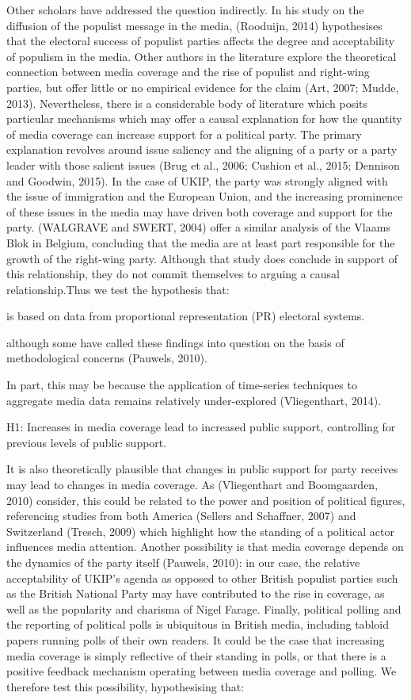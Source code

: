 \documentclass[12pt,article]{article}
\begin{document}
Other scholars have addressed the question indirectly. In his study on
the diffusion of the populist message in the media, (Rooduijn, 2014)
hypothesises that the electoral success of populist parties affects the
degree and acceptability of populism in the media. Other authors in the
literature explore the theoretical connection between media coverage and
the rise of populist and right-wing parties, but offer little or no
empirical evidence for the claim (Art, 2007; Mudde, 2013). Nevertheless,
there is a considerable body of literature which posits particular
mechanisms which may offer a causal explanation for how the quantity of
media coverage can increase support for a political party. The primary
explanation revolves around issue saliency and the aligning of a party
or a party leader with those salient issues (Brug et al., 2006; Cushion
et al., 2015; Dennison and Goodwin, 2015). In the case of UKIP, the
party was strongly aligned with the issue of immigration and the
European Union, and the increasing prominence of these issues in the
media may have driven both coverage and support for the party. (WALGRAVE
and SWERT, 2004) offer a similar analysis of the Vlaams Blok in Belgium,
concluding that the media are at least part responsible for the growth
of the right-wing party. Although that study does conclude in support of
this relationship, they do not commit themselves to arguing a causal
relationship.Thus we test the hypothesis that:

is based on data from proportional representation (PR) electoral
systems.

although some have called these findings into question on the basis of
methodological concerns (Pauwels, 2010).

In part, this may be because the application of time-series techniques
to aggregate media data remains relatively under-explored (Vliegenthart,
2014).

H1: Increases in media coverage lead to increased public support,
controlling for previous levels of public support.

It is also theoretically plausible that changes in public support for
party receives may lead to changes in media coverage. As (Vliegenthart
and Boomgaarden, 2010) consider, this could be related to the power and
position of political figures, referencing studies from both America
(Sellers and Schaffner, 2007) and Switzerland (Tresch, 2009) which
highlight how the standing of a political actor influences media
attention. Another possibility is that media coverage depends on the
dynamics of the party itself (Pauwels, 2010): in our case, the relative
acceptability of UKIP's agenda as opposed to other British populist
parties such as the British National Party may have contributed to the
rise in coverage, as well as the popularity and charisma of Nigel
Farage. Finally, political polling and the reporting of political polls
is ubiquitous in British media, including tabloid papers running polls
of their own readers. It could be the case that increasing media
coverage is simply reflective of their standing in polls, or that there
is a positive feedback mechanism operating between media coverage and
polling. We therefore test this possibility, hypothesising that:
\end{document}
